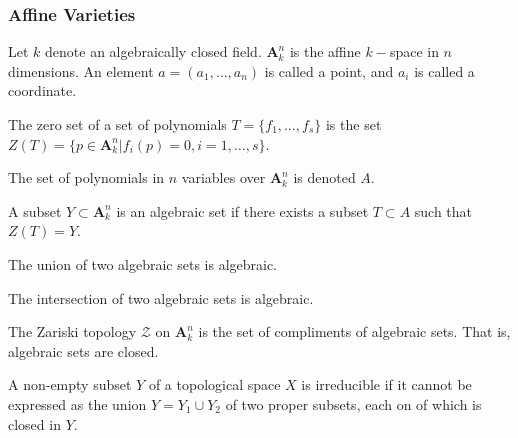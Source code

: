             \subsubsection{Affine Varieties}
                Let $k$ denote an algebraically closed field.
                $\textbf{A}_{k}^n$ is the affine $k-$space in
                $n$ dimensions. An element $a=(a_1,\hdots, a_n)$
                is called a point, and $a_i$ is called a coordinate.
                \begin{definition}
                    The zero set of a set of polynomials
                    $T=\{f_{1},\hdots,f_{s}\}$ is the set
                    $Z(T)%
                     =\{p\in\textbf{A}_{k}^{n}|f_{i}(p)=0,%
                        i=1,\hdots,s\}$.
                \end{definition}
                \begin{notation}
                    The set of polynomials in $n$ variables
                    over $\textbf{A}_{k}^{n}$ is denoted $A$.
                \end{notation}
                \begin{definition}
                    A subset $Y\subset\textbf{A}_{k}^{n}$ is an
                    algebraic set if there exists a subset
                    $T\subset{A}$ such that $Z(T)=Y$.
                \end{definition}
                \begin{theorem}
                    The union of two algebraic
                    sets is algebraic.
                \end{theorem}
                \begin{theorem}
                    The intersection of two algebraic
                    sets is algebraic.
                \end{theorem}
                \begin{definition}
                    The Zariski topology $\mathcal{Z}$ on
                    $\textbf{A}_{k}^{n}$ is the set of compliments
                    of algebraic sets. That is,
                    algebraic sets are closed.
                \end{definition}
                \begin{definition}
                    A non-empty subset $Y$ of a topological space
                    $X$ is irreducible if it cannot be expressed
                    as the union $Y={Y_{1}}\cup{Y_{2}}$ of
                    two proper subsets, each on of which is
                    closed in $Y$.
                \end{definition}
